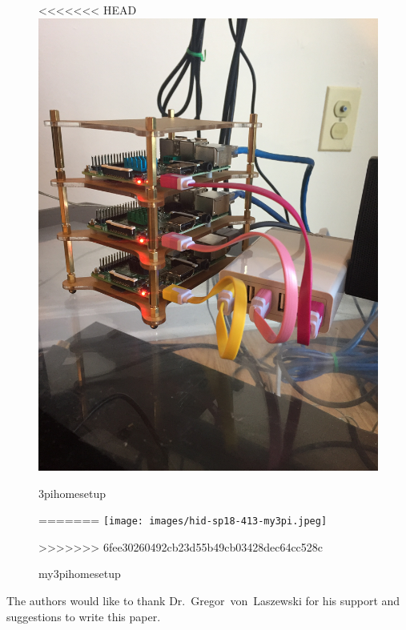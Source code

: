 \begin{figure}[!ht]
<<<<<<< HEAD
  \centering\includegraphics[width=\columnwidth]{images/hid-sp18-413-my3pi.png}
  \caption{3pihomesetup}
=======
  \centering\texttt{[image: images/hid-sp18-413-my3pi.jpeg]}
  \caption{my3pihomesetup}\label{F:setup}
>>>>>>> 6fee30260492cb23d55b49cb03428dec64cc528c
\end{figure}


\begin{acks}

  The authors would like to thank Dr.~Gregor~von~Laszewski for his
  support and suggestions to write this paper.

\end{acks}


 

